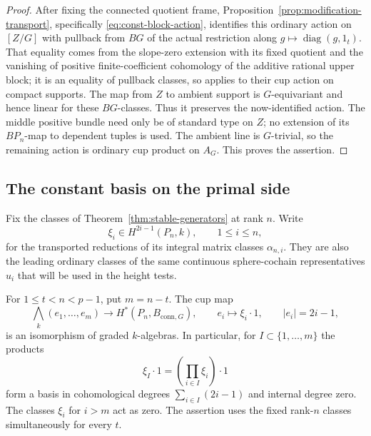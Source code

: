 \begin{proof}
After fixing the connected quotient frame,
Proposition~\ref{prop:modification-transport}, specifically
\eqref{eq:const-block-action}, identifies this ordinary action
on $[Z/G]$ with pullback from $BG$ of the actual restriction
along $g\mapsto\operatorname{diag}(g,1_t)$.
That equality comes from the slope-zero extension with its
fixed quotient and the vanishing of positive finite-coefficient
cohomology of the additive rational upper block; it is an
equality of pullback classes, so applies to their cup action
on compact supports.
The map from $Z$ to ambient support is $G$-equivariant and
hence linear for these $BG$-classes.  Thus it preserves the
now-identified action.  The middle positive bundle need only
be of standard type on $Z$; no extension of its $BP_n$-map
to dependent tuples is used.
The ambient line is $G$-trivial, so the remaining action is
ordinary cup product on $A_G$.  This proves the assertion.
\end{proof}

\subsection{The constant basis on the primal side}

Fix the classes of Theorem~\ref{thm:stable-generators} at rank $n$.
Write
\[
 \xi_i\in H^{2i-1}(P_n,k),\qquad 1\leq i\leq n,
\]
for the transported reductions of its integral matrix classes
$\alpha_{n,i}$.  They are also the leading ordinary classes of
the same continuous sphere-cochain representatives $u_i$ that
will be used in the height tests.

\begin{proposition}
\label{prop:constant-module}
For $1\leq t<n<p-1$, put $m=n-t$.  The cup map
\begin{equation}
\label{full:constant-basis}
 \bigwedge_k(e_1,\ldots,e_m)
     \longrightarrow H^*(P_n,B_{\mathrm{conn},G}),
 \qquad e_i\longmapsto \xi_i\cdot1,\qquad |e_i|=2i-1,
\end{equation}
is an isomorphism of graded $k$-algebras.
In particular, for $I\subset\{1,\ldots,m\}$ the products
\[
 \xi_I\cdot1=\left(\prod_{i\in I}\xi_i\right)\cdot1
\]
form a basis in cohomological degrees
$\sum_{i\in I}(2i-1)$ and internal degree zero.
The classes $\xi_i$ for $i>m$ act as zero.
The assertion uses the fixed rank-$n$ classes simultaneously
for every $t$.
\end{proposition}

